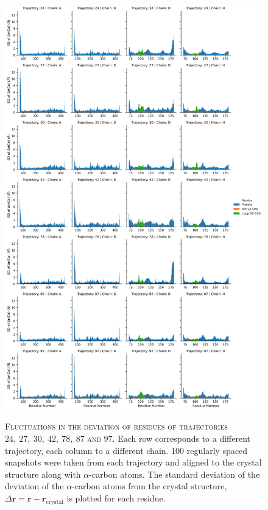 \begin{figure}[ph!]
    \centering
    \caption[Fluctuations in the deviation of residues of select trajectories]{\textsc{Fluctuations in the deviation of residues of trajectories $24,\ 27,\ 30,\ 42,\ 78,\ 87$ and $97$}. Each row corresponds to a different trajectory, each column to a different chain. \num{100} regularly spaced snapshots were taken from each trajectory and aligned to the crystal structure along with $\alpha$-carbon atoms. The standard deviation of the deviation of the $\alpha$-carbon atoms from the crystal structure, $\Delta\mathbf{r} = \mathbf{r}-\mathbf{r}_{\mathrm{crystal}}$ is plotted for each residue.}
    \includegraphics[height=0.8\textheight]{chapters/aadh/figures/sd_dev_by_residue.png}
    \label{fig:aadh_sd_dev_by_res}
\end{figure}

